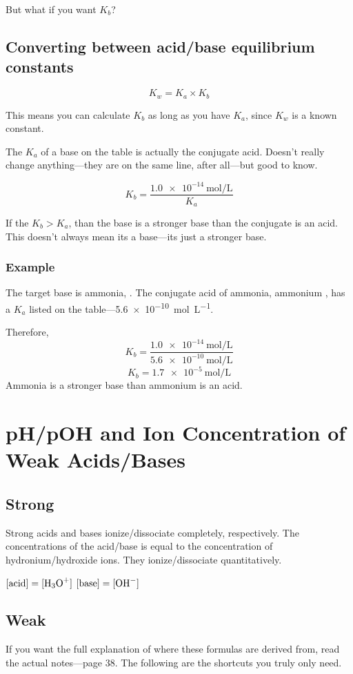 \documentclass[a4paper,12pt]{article}
\begin{document}
But what if you want $K_b$?

\subsection{Converting between acid/base equilibrium constants}
\Large
$$K_w = K_a \times K_b$$
\normalsize

This means you can calculate $K_b$ as long as you have $K_a$, since $K_w$ is a known constant.

The $K_a$ of a base on the table is actually the conjugate acid. Doesn't really change anything---they are on the same line, after all---but good to know.

\Large
$$K_b = \frac{\SI{1.0e-14}{\mol\per\L}}{K_a}$$
\normalsize

If the $K_b > K_a$, than the base is a stronger base than the conjugate is an acid. This doesn't always mean its a base---its just a stronger base.

\subsubsection{Example}
The target base is ammonia, . The conjugate acid of ammonia, ammonium , has a $K_a$ listed on the table---\SI{5.6e-10}{\mol\per\L}.

Therefore,
$$K_b = \frac{\SI{1.0e-14}{\mol\per\L}}{\SI{5.6e-10}{\mol\per\L}}$$
$$K_b = \SI{1.7e-5}{\mol\per\L}$$
Ammonia  is a stronger base than ammonium  is an acid.

\section{pH/pOH and Ion Concentration of Weak Acids/Bases}
\subsection{Strong}
Strong acids and bases ionize/dissociate completely, respectively. The concentrations of the acid/base is equal to the concentration of hydronium/hydroxide ions. They ionize/dissociate quantitatively.

\begin{center}
    $[\textrm{acid}] = [\ce{H3O+}]$ \hspace{1in} $[\textrm{base}] = [\ce{OH-}]$
\end{center}

\subsection{Weak}
If you want the full explanation of where these formulas are derived from, read the actual notes---page 38. The following are the shortcuts you truly only need.
\end{document}
